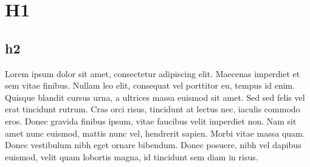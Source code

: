 \section{H1}
\subsection{h2}
Lorem ipsum dolor sit amet, consectetur adipiscing elit. Maecenas imperdiet et sem vitae finibus. Nullam leo elit, consequat vel porttitor eu, tempus id enim. Quisque blandit cursus urna, a ultrices massa euismod sit amet. Sed sed felis vel erat tincidunt rutrum. Cras orci risus, tincidunt at lectus nec, iaculis commodo eros. Donec gravida finibus ipsum, vitae faucibus velit imperdiet non. Nam sit amet nunc euismod, mattis nunc vel, hendrerit sapien. Morbi vitae massa quam. Donec vestibulum nibh eget ornare bibendum. Donec posuere, nibh vel dapibus euismod, velit quam lobortis magna, id tincidunt sem diam in risus.